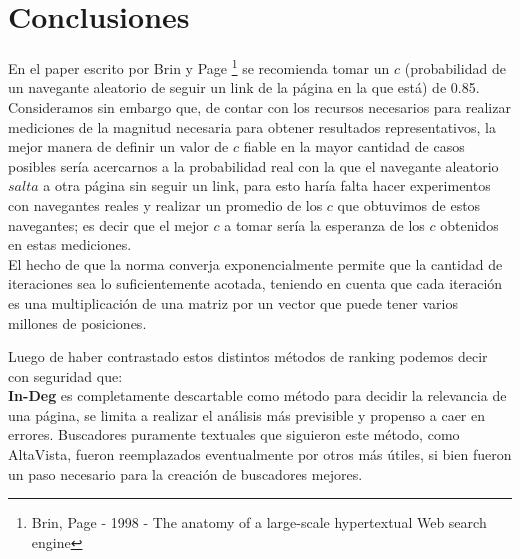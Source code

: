 \documentclass[a4paper]{article}
\begin{document}

\newpage

\section{Conclusiones}
\label{sec:conclusiones}


En el paper escrito por Brin y Page \footnote{Brin, Page - 1998 - The anatomy of a large-scale hypertextual Web search engine} se recomienda tomar un $c$ (probabilidad de un navegante aleatorio de seguir un link de la página en la que está) de 0.85. Consideramos sin embargo que, de contar con los recursos necesarios para realizar mediciones de la magnitud necesaria para obtener resultados representativos, la mejor manera de definir un valor de $c$ fiable en la mayor cantidad de casos posibles sería acercarnos a la probabilidad real con la que el navegante aleatorio $salta$ a otra página sin seguir un link, para esto haría falta hacer experimentos con navegantes reales y realizar un promedio de los $c$ que obtuvimos de estos navegantes; es decir que el mejor $c$ a tomar sería la esperanza de los $c$ obtenidos en estas mediciones.\\

El hecho de que la norma converja exponencialmente permite que la cantidad de iteraciones sea lo suficientemente acotada, teniendo en cuenta que cada iteración es una multiplicación de una matriz por un vector que puede tener varios millones de posiciones.


Luego de haber contrastado estos distintos métodos de ranking podemos decir con seguridad que:\\


\textbf{In-Deg} es completamente descartable como método para decidir la relevancia de una página, se limita a realizar el análisis más previsible y propenso a caer en errores.
Buscadores puramente textuales que siguieron este método, como AltaVista, fueron reemplazados eventualmente por otros más útiles, si bien fueron un paso necesario para la creación de buscadores mejores.\\ 
\end{document}
